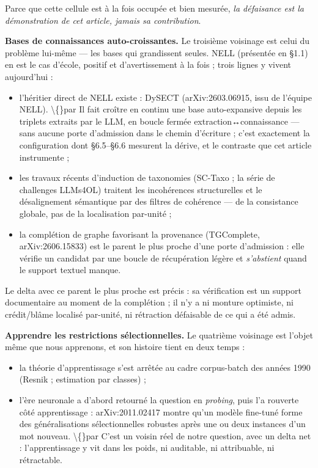 \documentclass[11pt]{article}
\begin{document}
Parce que cette cellule est à la fois occupée et bien mesurée, \emph{la défaisance est la démonstration de cet article, jamais sa contribution}.

\textbf{Bases de connaissances auto-croissantes.} Le troisième voisinage est celui du problème lui-même — les bases qui grandissent seules. NELL (présentée en §1.1) en est le cas d'école, positif et d'avertissement à la fois ; trois lignes y vivent aujourd'hui :

\begin{itemize}
\item l'héritier direct de NELL existe : DySECT (arXiv:2603.06915, issu de l'équipe NELL). \textbackslash\{\}par Il fait croître en continu une base auto-expansive depuis les triplets extraits par le LLM, en boucle fermée extraction↔connaissance — sans aucune porte d'admission dans le chemin d'écriture ; c'est exactement la configuration dont §6.5–§6.6 mesurent la dérive, et le contraste que cet article instrumente ;

\item les travaux récents d'induction de taxonomies (SC-Taxo ; la série de challenges LLMs4OL) traitent les incohérences structurelles et le désalignement sémantique par des filtres de cohérence — de la consistance globale, pas de la localisation par-unité ;
\item la complétion de graphe favorisant la provenance (TGComplete, arXiv:2606.15833) est le parent le plus proche d'une porte d'admission : elle vérifie un candidat par une boucle de récupération légère et \emph{s'abstient} quand le support textuel manque.
\end{itemize}

Le delta avec ce parent le plus proche est précis : sa vérification est un support documentaire au moment de la complétion ; il n'y a ni monture optimiste, ni crédit/blâme localisé par-unité, ni rétraction défaisable de ce qui a été admis.

\textbf{Apprendre les restrictions sélectionnelles.} Le quatrième voisinage est l'objet même que nous apprenons, et son histoire tient en deux temps :

\begin{itemize}
\item la théorie d'apprentissage s'est arrêtée au cadre corpus-batch des années 1990 (Resnik ; estimation par classes) ;
\item l'ère neuronale a d'abord retourné la question en \emph{probing}, puis l'a rouverte côté apprentissage : arXiv:2011.02417 montre qu'un modèle fine-tuné forme des généralisations sélectionnelles robustes après une ou deux instances d'un mot nouveau. \textbackslash\{\}par C'est un voisin réel de notre question, avec un delta net : l'apprentissage y vit dans les poids, ni auditable, ni attribuable, ni rétractable.
\end{itemize}
\end{document}
